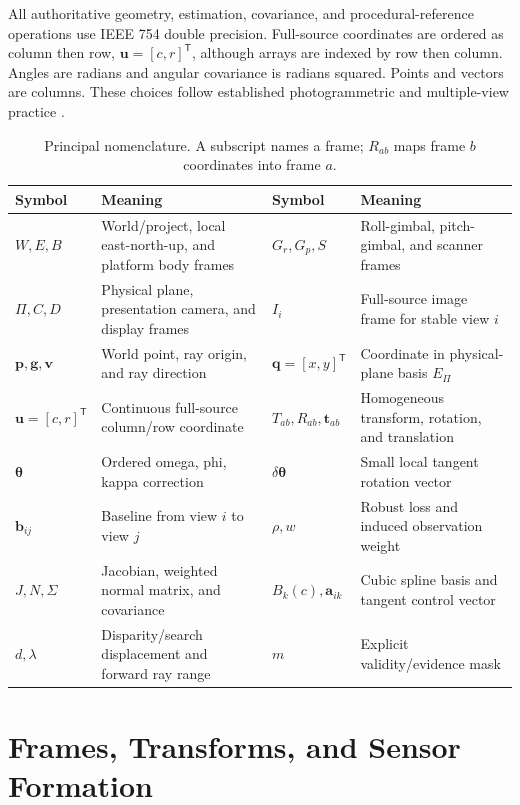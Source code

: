 \documentclass[journal]{IEEEtran}
\newcommand{\T}{^{\mathsf T}}
\begin{document}
All authoritative geometry, estimation, covariance, and procedural-reference
operations use IEEE 754 double precision. Full-source coordinates are ordered
as column then row, $\bm u=[c,r]\T$, although arrays are indexed by row then
column. Angles are radians and angular covariance is radians squared. Points and
vectors are columns. These choices follow established photogrammetric and
multiple-view practice \cite{Brown1971,HartleyZisserman2004,ForstnerWrobel2016}.

\begin{table}[t]
\caption{Principal nomenclature. A subscript names a frame; $R_{ab}$ maps frame $b$ coordinates into frame $a$.}
\label{tab:nomenclature}
\centering
\footnotesize
\begin{tabular}{p{}p{}p{}p{}}
\toprule
Symbol & Meaning & Symbol & Meaning \\
\midrule
$W,E,B$ & World/project, local east-north-up, and platform body frames
& $G_r,G_p,S$ & Roll-gimbal, pitch-gimbal, and scanner frames \\
$\Pi,C,D$ & Physical plane, presentation camera, and display frames
& $I_i$ & Full-source image frame for stable view $i$ \\
$\bm p,\bm g,\bm v$ & World point, ray origin, and ray direction
& $\bm q=[x,y]\T$ & Coordinate in physical-plane basis $E_\Pi$ \\
$\bm u=[c,r]\T$ & Continuous full-source column/row coordinate
& $T_{ab},R_{ab},\bm t_{ab}$ & Homogeneous transform, rotation, and translation \\
$\bm\theta$ & Ordered omega, phi, kappa correction
& $\delta\bm\theta$ & Small local tangent rotation vector \\
$\bm b_{ij}$ & Baseline from view $i$ to view $j$
& $\rho,w$ & Robust loss and induced observation weight \\
$J,N,\Sigma$ & Jacobian, weighted normal matrix, and covariance
& $B_k(c),\bm a_{ik}$ & Cubic spline basis and tangent control vector \\
$d,\lambda$ & Disparity/search displacement and forward ray range
& $m$ & Explicit validity/evidence mask \\
\bottomrule
\end{tabular}
\end{table}

\section{Frames, Transforms, and Sensor Formation}
\end{document}

